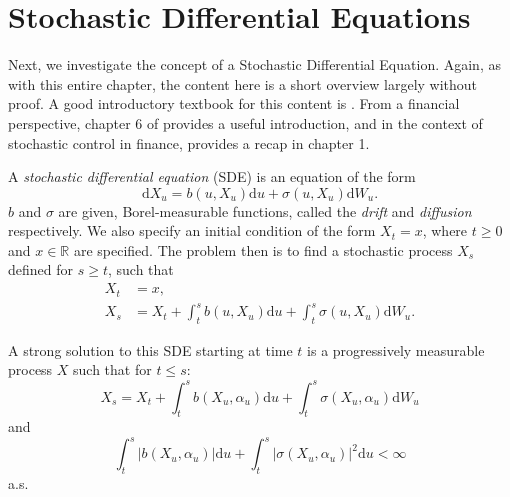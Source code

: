 \section{Stochastic Differential Equations}\label{sec:1.6}

Next, we investigate the concept of a Stochastic Differential Equation. Again, as 
with this entire chapter, the content here is a short overview largely without proof.
A good introductory textbook for this content is \textcite{ASDEs}. From a financial 
perspective, chapter 6 of \textcite{SCfFII} provides a useful introduction, and in the 
context of stochastic control in finance, \textcite{Pham} provides a recap in chapter 1.

\begin{definition}
    A \emph{stochastic differential equation} (SDE) is an equation of the form
    \begin{equation}\label{eq:1.28}
        \mathrm dX_u=b(u,X_u)\mathrm du+\sigma(u,X_u)\mathrm dW_u.
    \end{equation}
    $b$ and $\sigma$ are given, Borel-measurable functions, called the
    \emph{drift} and \emph{diffusion} respectively. We also specify an initial condition
    of the form $X_t=x$, where $t\geq0$ and $x\in\mathbb{R}$ are specified. The problem
    then is to find a stochastic process $X_s$ defined for $s\geq t$, such that
    \begin{align*}
        X_t&=x,\\
        X_s&=X_t+\int_t^sb(u,X_u)\mathrm du+\int_t^s\sigma(u,X_u)\mathrm dW_u.
    \end{align*}
\end{definition}

\begin{definition}
    A strong solution to this SDE starting at time $t$ is a progressively measurable 
    process $X$ such that for $t\leq s$:
    $$X_s=X_t+\int_{t}^{s}b(X_u,\alpha_u)\mathrm du+\int_t^s\sigma(X_u,\alpha_u)\mathrm dW_u$$
    and
    $$\int_t^s|b(X_u,\alpha_u)|\mathrm du+\int_t^s|\sigma(X_u,\alpha_u)|^2\mathrm du<\infty$$
    a.s.
\end{definition}

